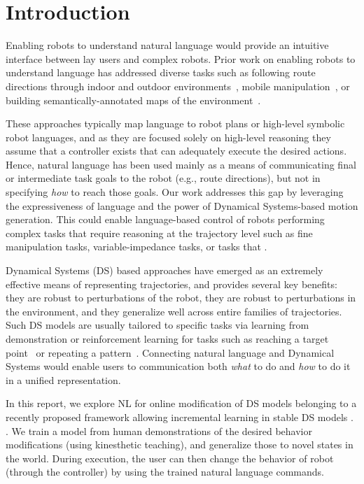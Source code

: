 \section{Introduction}
\label{secIntroduction}

Enabling robots to understand natural language would provide an intuitive interface between lay users and complex robots.
Prior work on enabling robots to understand language has addressed diverse tasks such as following route directions through indoor and outdoor environments~\cite{macmahon06, kollar10, matuszek12a, duvallet13, boularias15}, mobile manipulation~\cite{tellex11, howard14a}, or building semantically-annotated maps of the environment~\cite{walter13}.

These approaches typically map language to robot plans or high-level symbolic robot languages, and as they are focused solely on high-level reasoning they assume that a controller exists that can adequately execute the desired actions.
Hence, natural language has been used mainly as a means of communicating final or intermediate task goals to the robot (e.g., route directions), but not in specifying \emph{how} to reach those goals.
Our work addresses this gap by leveraging the expressiveness of language and the power of Dynamical Systems-based motion generation.
This could enable language-based control of robots performing complex tasks that require reasoning at the trajectory level such as fine manipulation tasks, variable-impedance tasks, or tasks that .


Dynamical Systems (DS) based approaches have emerged as an extremely effective means of representing trajectories, and provides several key benefits:
they are robust to perturbations of the robot,
they are robust to perturbations in the environment,
and they generalize well across entire families of trajectories.
Such DS models are usually tailored to specific tasks via learning from demonstration or reinforcement learning for tasks such as reaching a target point~\cite{KhansariZadeh2011,Calinon2012} or repeating a pattern~\cite{Buchli2006,Kronander2015}.
Connecting natural language and Dynamical Systems would enable users to communication both \emph{what} to do and \emph{how} to do it in a unified representation.

In this report, we explore NL for online modification of DS models belonging to a recently proposed framework allowing incremental learning in stable DS models . .
We train a model from human demonstrations of the desired behavior modifications (using kinesthetic teaching), and generalize those to novel states in the world.
During execution, the user can then change the behavior of robot (through the controller) by using the trained natural language commands.




